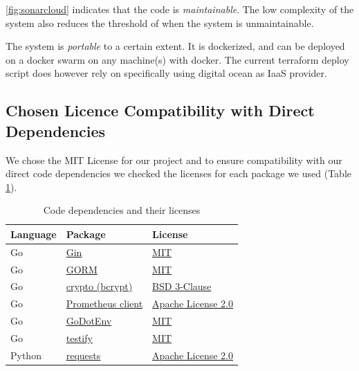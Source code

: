 \ref{fig:sonarcloud} indicates that the code is \emph{maintainable}. The low complexity of the system also reduces the threshold of when the system is unmaintainable.

The system is \emph{portable} to a certain extent. It is dockerized, and can be deployed on a docker swarm on any machine(s) with docker. The current terraform deploy script does however rely on specifically using digital ocean as IaaS provider.

\subsection{Chosen Licence Compatibility with Direct Dependencies}

We chose the MIT License for our project and to ensure compatibility with our direct code dependencies we checked the licenses for each package we used (Table \ref{table:dep}).

\begin{table}[!h]
\centering
\begin{tabular}{lll}
\toprule
Language & Package & License \\ 
\midrule
Go & \href{https://github.com/gin-gonic/gin}{Gin} & \href{https://github.com/gin-gonic/gin/blob/master/LICENSE}{MIT} \\ 
Go & \href{https://github.com/go-gorm/gorm}{GORM} & \href{https://github.com/go-gorm/gorm/blob/master/License}{MIT} \\ 
Go & \href{https://pkg.go.dev/golang.org/x/crypto/bcrypt}{crypto (bcrypt)} & \href{https://pkg.go.dev/golang.org/x/crypto/bcrypt?tab=licenses}{BSD 3-Clause} \\ 
Go & \href{https://github.com/prometheus/client_golang}{Prometheus client} & \href{https://github.com/prometheus/client_golang/blob/main/LICENSE}{Apache License 2.0} \\ 
Go & \href{https://github.com/joho/godotenv}{GoDotEnv} & \href{https://github.com/joho/godotenv/blob/main/LICENCE}{MIT} \\ 
Go & \href{https://github.com/stretchr/testify}{testify} & \href{https://github.com/stretchr/testify/blob/master/LICENSE}{MIT} \\ 
Python & \href{https://github.com/psf/requests}{requests} & \href{https://github.com/psf/requests/blob/main/LICENSE}{Apache License 2.0} \\ 
\bottomrule
\end{tabular}
\caption{Code dependencies and their licenses}
\label{table:dep}
\end{table}

